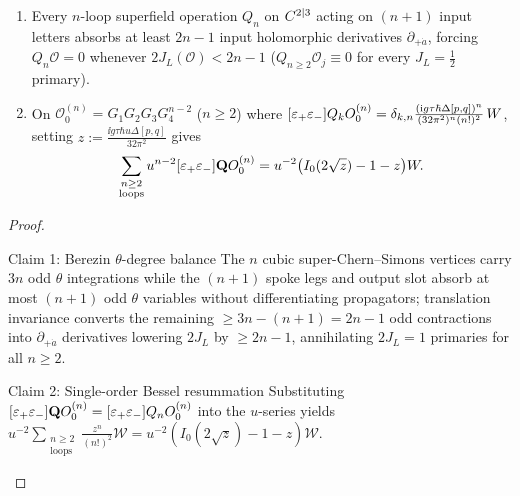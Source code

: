 \begin{lemma}
\label{lem:bessel-spin-bound}
\leavevmode
\begin{enumerate}[label=(\arabic*),leftmargin=*]
  \item Every $n$-loop superfield operation $Q_n$ on $C^{2|3}$ acting on $(n+1)$ input letters absorbs at least $2n-1$ input holomorphic derivatives $\partial_{+\dot{a}}$, forcing $Q_n\mathcal{O} = 0$ whenever $2J_L(\mathcal{O}) < 2n-1$ ($Q_{n\ge 2}\mathcal{O}_j \equiv 0$ for every $J_L = \frac{1}{2}$ primary).

  \item On $\mathcal{O}_0^{(n)} = G_1 G_2 G_3 G_4^{n-2}$ ($n \ge 2$) where $[\varepsilon_+\varepsilon_-]Q_kO_0^{(n)} = \delta_{k,n}\frac{(\mathrm{i} g\tau\hbar\Delta[p,q])^n}{(32\pi^2)^n(n!)^2}\,W$, setting $z := \frac{\ii g\tau\hbar u\Delta[p,q]}{32\pi^2}$ gives
  \[
  \sum_{\substack{n\ge 2\\\mathrm{loops}}}u^{n-2}[\varepsilon_+\varepsilon_-]\mathbf{Q}O_0^{(n)} = u^{-2}\bigl(I_0(2\sqrt{z}) - 1 - z\bigr)W.
  \]
\end{enumerate}
\end{lemma}

\begin{proof}\leavevmode
\begin{proofpart}{Claim 1: Berezin $\theta$-degree balance}
The $n$ cubic super-Chern--Simons vertices carry $3n$ odd $\theta$ integrations while the $(n+1)$ spoke legs and output slot absorb at most $(n+1)$ odd $\theta$ variables without differentiating propagators; translation invariance converts the remaining $\ge 3n - (n+1) = 2n-1$ odd contractions into $\partial_{+\dot{a}}$ derivatives lowering $2J_L$ by $\ge 2n-1$, annihilating $2J_L = 1$ primaries for all $n \ge 2$.
\end{proofpart}
\begin{proofpart}{Claim 2: Single-order Bessel resummation}
Substituting $[\varepsilon_+\varepsilon_-]\mathbf{Q}O_0^{(n)} = [\varepsilon_+\varepsilon_-]Q_nO_0^{(n)}$ into the $u$-series yields $u^{-2}\sum_{\substack{n\ge 2\\\mathrm{loops}}}\frac{z^n}{(n!)^2}\mathcal{W} = u^{-2}(I_0(2\sqrt{z}) - 1 - z)\mathcal{W}$.
\end{proofpart}
\end{proof}

